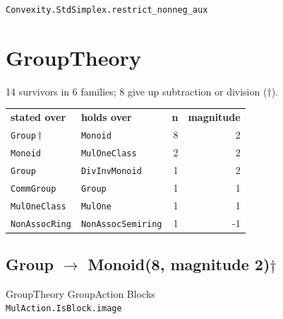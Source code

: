 \documentclass[10pt,a4paper]{article}
\begin{document}
\hspace*{1em}\texttt{\small Convexity.\allowbreak{}StdSimplex.\allowbreak{}restrict\_nonneg\_aux}\\
\hspace*{2em}{\footnotesize\itshape signature not resolved}

\clearpage
\section{GroupTheory}
14 survivors in 6 families; 8 give up subtraction or division ($\dagger$).

\begin{center}
\begin{tabular}{llrr}
\textbf{stated over} & \textbf{holds over} & \textbf{n} & \textbf{magnitude}\\[2pt]
\texttt{\small Group}\,$\dagger$ & \texttt{\small Monoid} & 8 & 2\\
\texttt{\small Monoid} & \texttt{\small MulOneClass} & 2 & 2\\
\texttt{\small Group} & \texttt{\small DivInvMonoid} & 1 & 2\\
\texttt{\small CommGroup} & \texttt{\small Group} & 1 & 1\\
\texttt{\small MulOneClass} & \texttt{\small MulOne} & 1 & 1\\
\texttt{\small NonAssocRing} & \texttt{\small NonAssocSemiring} & 1 & -1\\
\end{tabular}
\end{center}

\subsection*{Group $\to$ Monoid\quad\textmd{\small (8, magnitude 2)\;$\dagger$}}
{\footnotesize\color{locator}GroupTheory\,\textperiodcentered\,GroupAction\,\textperiodcentered\,Blocks}\\
\hspace*{1em}\texttt{\small MulAction.\allowbreak{}IsBlock.\allowbreak{}image}\\
\end{document}
